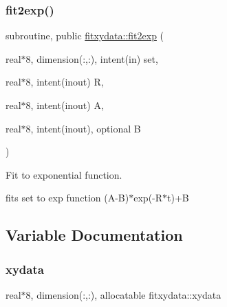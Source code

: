 \subsubsection{\texorpdfstring{fit2exp()}{fit2exp()}}
{\footnotesize\ttfamily subroutine, public \hyperlink{interfacefitxydata_1_1fit2exp}{fitxydata\+::fit2exp} (\begin{DoxyParamCaption}\item[{real$\ast$8, dimension(\+:,\+:), intent(in)}]{set,  }\item[{real$\ast$8, intent(inout)}]{R,  }\item[{real$\ast$8, intent(inout)}]{A,  }\item[{real$\ast$8, intent(inout), optional}]{B }\end{DoxyParamCaption})}



Fit to exponential function. 

fits set to exp function (A-\/B)$\ast$exp(-\/\+R$\ast$t)+B 

\subsection{Variable Documentation}
\mbox{\label{namespacefitxydata_ad69a6716eab16a1f8c170a0d0a7ed499}} 
\subsubsection{\texorpdfstring{xydata}{xydata}}
{\footnotesize\ttfamily real$\ast$8, dimension(\+:,\+:), allocatable fitxydata\+::xydata\hspace{0.3cm}{\ttfamily [private]}}

